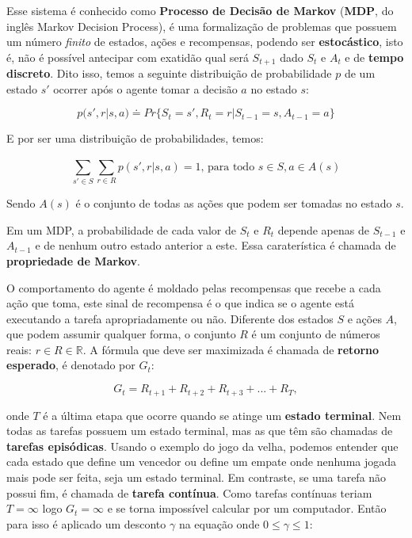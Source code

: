 Esse sistema é conhecido como \textbf{Processo de Decisão de Markov} (\textbf{MDP}, do inglês Markov Decision Process), é uma formalização de problemas que possuem um número \textit{finito} de estados, ações e recompensas, podendo ser \textbf{estocástico}, isto é, não é possível antecipar com exatidão qual será $S_{t+1}$ dado $S_t$ e $A_t$ e de \textbf{tempo discreto}. Dito isso, temos a seguinte distribuição de probabilidade $p$ de um estado $s'$ ocorrer após o agente tomar a decisão $a$ no estado $s$:

\begin{equation} \label{p-definition}
   p(s', r | s, a) \doteq Pr\{S_t = s', R_t = r | S_{t-1} = s, A_{t-1} = a\}
\end{equation}

E por ser uma distribuição de probabilidades, temos: 

\begin{equation} \label{p-sum}
   \sum_{s' \in S}^{} \sum_{r \in R}^{}p(s', r | s, a) = 1 \text{, para todo } s \in S, a \in A(s) 
\end{equation}

Sendo $A(s)$ é o conjunto de todas as ações que podem ser tomadas no estado $s$.

Em um MDP, a probabilidade de cada valor de $S_t$ e $R_t$ depende apenas de $S_{t-1}$ e $A_{t-1}$ e de nenhum outro estado anterior a este. Essa caraterística  é chamada de \textbf{propriedade de Markov}. 

O comportamento do agente é moldado pelas recompensas que recebe a cada ação que toma, este sinal de recompensa é o que indica se o agente está executando a tarefa apropriadamente ou não. Diferente dos estados $S$ e ações $A$, que podem assumir qualquer forma, o conjunto $R$ é um conjunto de números reais: $r \in R \in \mathbb{R}$. A fórmula que deve ser maximizada é chamada de \textbf{retorno esperado}, é denotado por $G_t$:

\begin{equation} \label{expected-return}
   G_t = R_{t+1} + R_{t+2} + R_{t+3} + ... + R_{T},
\end{equation}

onde $T$ é a última etapa que ocorre quando se atinge um \textbf{estado terminal}. Nem todas as tarefas possuem um estado terminal, mas as que têm são chamadas de \textbf{tarefas episódicas}. Usando o exemplo do jogo da velha, podemos entender que cada estado que define um vencedor ou define um empate onde nenhuma jogada mais pode ser feita, seja um estado terminal. Em contraste, se uma tarefa não possui fim, é chamada de \textbf{tarefa contínua}. Como tarefas contínuas teriam $T = \infty$ logo $G_t = \infty$ e se torna impossível calcular por um computador. Então para isso é aplicado um desconto $\gamma$ na equação onde $0 \leqslant \gamma \leqslant 1$:

